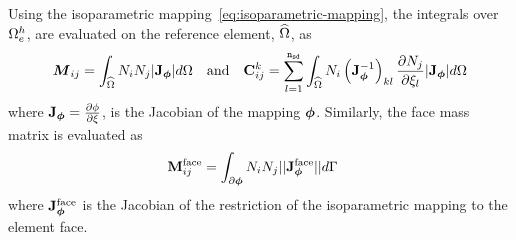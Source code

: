 Using the isoparametric mapping~\eqref{eq:isoparametric-mapping}, the integrals over $\Omega_e^{h}$, are evaluated on the reference element, $\widehat{\Omega}$, as
\begin{align*}
\boldsymbol{M}_{ij} = \int_{\widehat{\Omega}} N_i N_j |\mathbf{J}_{\boldsymbol{\phi}}| d\Omega \quad \text{and} \quad
\mathbf{C}^{k}_{ij} = 
                               \sum_{l=1}^{\texttt{n}_{\texttt{sd}}}
                                \int_{\widehat{\Omega}} N_i
                               \left( 
                                   \mathbf{J}_{\boldsymbol{\phi}}^{-1}
                               \right)_{kl}
                               \frac{\partial N_j}{\partial \xi_{l}}
                             |\mathbf{J}_{\boldsymbol{\phi}}|
                             d\Omega
\end{align*}
where $\mathbf{J}_{\boldsymbol{\phi}} = \frac{\partial \phi}{ \partial \xi}$, is the Jacobian of the mapping $\boldsymbol{\phi}$. Similarly, the face mass matrix is evaluated as
\begin{align*}
\mathbf{M}^{\textrm{face}}_{ij} &= \int_{\partial \boldsymbol{\phi}} N_i N_j || \mathbf{J}^{\textrm{face}}_{\boldsymbol{\phi}} || d\Gamma
\end{align*}
where $\mathbf{J}^{\textrm{face}}_{\boldsymbol{\phi}}$ is the Jacobian of the restriction of the isoparametric mapping to the element face.

